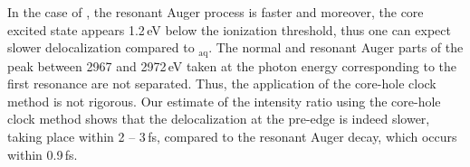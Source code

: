 In the case of \ki, the resonant Auger process is faster and moreover, the core excited state appears 1.2\,eV below the ionization threshold, thus one can expect slower delocalization compared to \cli$_{\text{aq}}$. The normal and resonant Auger parts of the peak between 2967 and 2972\,eV taken at the photon energy corresponding to the first resonance are not separated. Thus, the application of the core-hole clock method is not rigorous. Our estimate of the intensity ratio using the core-hole clock method shows that the delocalization at the pre-edge is indeed slower, taking place within 2 -- 3\,fs, compared to the resonant Auger decay, which occurs within 0.9\,fs.


%
%
%
%
%
%
%
